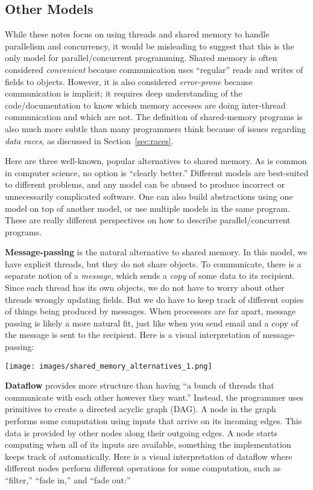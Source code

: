\documentclass[10pt]{article}
\begin{document}
\subsection{Other Models}

While these notes focus on using threads and shared memory to handle
parallelism and concurrency, it would be misleading to suggest that
this is the only model for parallel/concurrent programming.  Shared
memory is often considered \emph{convenient} because communication
uses ``regular'' reads and writes of fields to objects.  However, it
is also considered \emph{error-prone} because communication is
implicit; it requires deep understanding of the code/documentation to
know which memory accesses are doing inter-thread communication and
which are not.  The definition of shared-memory programs is also much
more subtle than many programmers think because of issues regarding
\emph{data races}, as discussed in Section~\ref{sec:races}.  

Here are three well-known, popular alternatives to shared memory.  As
is common in computer science, no option is ``clearly better.''
Different models are best-suited to different problems, and any model
can be abused to produce incorrect or unnecessarily complicated
software.  One can also build abstractions using one model on top of
another model, or use multiple models in the same program.  These are
really different perspectives on how to describe parallel/concurrent
programs.

\medskip
\noindent\textbf{Message-passing} is the natural alternative to shared memory.
In this model, we have explicit threads, but they do not share
objects.  To communicate, there is a separate notion of a
\emph{message}, which sends a \emph{copy} of some data to its
recipient.  Since each thread has its own objects, we do not have to
worry about other threads wrongly updating fields.  But we do have to
keep track of different copies of things being produced by messages.
When processors are far apart, message passing is likely a more
natural fit, just like when you send email and a copy of the message
is sent to the recipient.  Here is a visual interpretation of message-passing:

\begin{center}
\medskip
\texttt{[image: images/shared\_memory\_alternatives\_1.png]}
\end{center}


\medskip
\noindent\textbf{Dataflow} provides more structure than having ``a bunch of
threads that communicate with each other however they want.''
Instead, the programmer uses primitives to create a directed acyclic
graph (DAG).  A node in the graph performs some computation using
inputs that arrive on its incoming edges.  This data is provided by
other nodes along their outgoing edges.  A node starts computing when
all of its inputs are available, something the implementation keeps
track of automatically.  Here is a visual interpretation of dataflow
where different nodes perform different operations for some
computation, such as ``filter,'' ``fade in,'' and ``fade out:''
\end{document}
